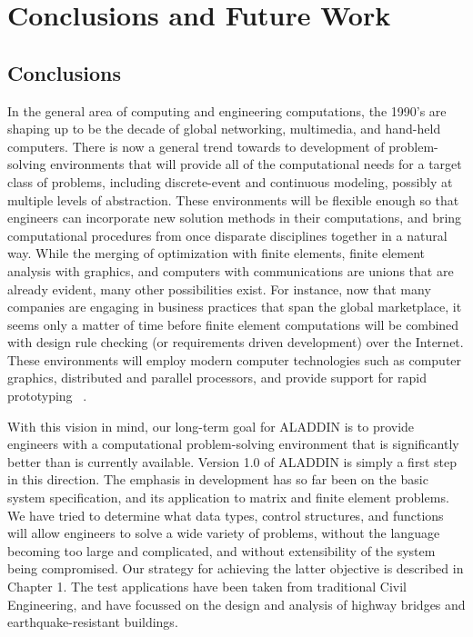 
\chapter{Conclusions and Future Work}

\section{Conclusions}

\vspace{0.15 in}
\noindent\hspace{0.5 in}
In the general area of computing and engineering computations,
the 1990's are shaping up to be the decade of global
networking, multimedia, and hand-held computers.
There is now a general trend towards to development of
problem-solving environments that will
provide all of the computational needs for a target class of problems,
including discrete-event and continuous modeling,
possibly at multiple levels of abstraction.
These environments will be flexible enough so that
engineers can incorporate new solution methods in their computations,
and bring computational procedures from once
disparate disciplines together in a natural way.
While the merging of optimization with finite elements,
finite element analysis with graphics,
and computers with communications are unions that are already evident,
many other possibilities exist.
For instance, now that many companies are engaging in 
business practices that span the global marketplace,
it seems only a matter of time before finite element computations will be combined
with design rule checking (or requirements driven development) over the Internet.
These environments will employ modern computer technologies
such as computer graphics, distributed and parallel processors,
and provide support for rapid prototyping ~\cite{gallopoulos94,tesler91}.

\vspace{0.15 in}
\noindent\hspace{0.5 in}
With this vision in mind, our long-term goal for ALADDIN is to provide engineers with
a computational problem-solving environment that is
significantly better than is currently available.
Version 1.0 of ALADDIN is simply a first step in this direction.
The emphasis in development has so far been on the basic system specification,
and its application to matrix and finite element problems.
We have tried to determine what data types, control structures,
and functions will allow engineers to solve a wide variety of problems, 
without the language becoming too large and complicated,
and without extensibility of the system being compromised.
Our strategy for achieving the latter objective is described in Chapter 1.
The test applications have been taken from traditional Civil Engineering,
and have focussed on the design and analysis of
highway bridges and earthquake-resistant buildings.

